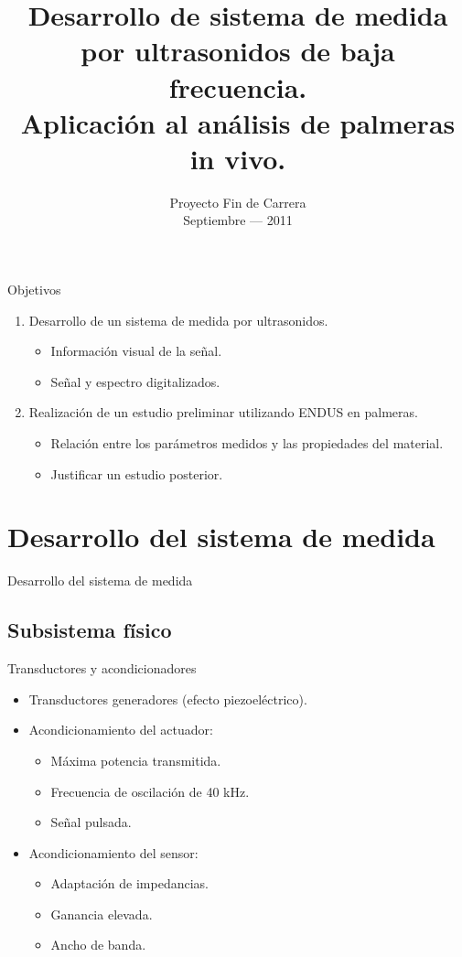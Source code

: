 \documentclass[utf8, compress]			{beamer}
\title[ENDUS: Sistema de medida y aplicación en palmeras in vivo.]{
    Desarrollo de sistema de medida por ultrasonidos de baja frecuencia. \\
    Aplicación al análisis de palmeras in vivo.
}
\author[José Ramón Gisbert Valls]{
    \vbox{
	\makebox[\director][r]{AUTOR: José Ramón Gisbert Valls}
	\makebox[\director][r]{DIRECTOR: Alberto Rodríguez Martínez}
    }
}
\institute[Universidad Miguel Hernández de Elche]{
    Universidad Miguel Hernández de Elche \medskip\par
    Escuela Politécnica Superior de Elche
}
\date[Septiembre --- 2011]{
    Proyecto Fin de Carrera \\
    Septiembre --- 2011
}
\begin{document}
\frame[plain]{\titlepage}

\begin{frame}{Objetivos}
    \begin{enumerate}
	\item Desarrollo de un \alert{sistema de medida por
	    ultrasonidos}.
	    \begin{itemize}
		\item Información visual de la señal.
		\item Señal y espectro digitalizados.
	    \end{itemize}
	\item Realización de un estudio preliminar utilizando
	    \alert{ENDUS en palmeras}.
	    \begin{itemize}
		\item Relación entre los parámetros medidos y las propiedades
		    del material.
		\item Justificar un estudio posterior.
	    \end{itemize}
    \end{enumerate}
\end{frame}


\section{Desarrollo del sistema de medida}

\begin{frame}{Desarrollo del sistema de medida}
    \tableofcontents[currentsection]
\end{frame}


\subsection{Subsistema físico}

\begin{frame}{Transductores y acondicionadores}
    \begin{itemize}
	\item Transductores generadores (efecto piezoeléctrico).
	\item Acondicionamiento del actuador:
	    \begin{itemize}
		\item Máxima potencia transmitida.
		\item Frecuencia de oscilación de 40 kHz.
		\item Señal pulsada.
	    \end{itemize}
	\item Acondicionamiento del sensor:
	    \begin{itemize}
		\item Adaptación de impedancias.
		\item Ganancia elevada.
		\item Ancho de banda.
	    \end{itemize}
    \end{itemize}
\end{frame}
\end{document}
